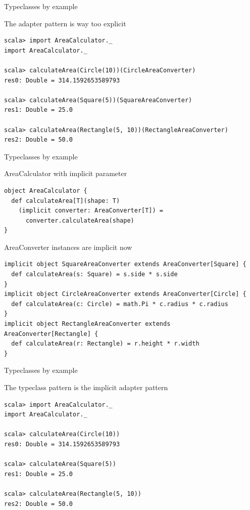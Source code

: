 \begin{frame}[fragile]{Typeclasses by example}
\begin{block}{The adapter pattern is way too explicit}
\begin{lstlisting}
scala> import AreaCalculator._
import AreaCalculator._

scala> calculateArea(Circle(10))(CircleAreaConverter)
res0: Double = 314.1592653589793

scala> calculateArea(Square(5))(SquareAreaConverter)
res1: Double = 25.0

scala> calculateArea(Rectangle(5, 10))(RectangleAreaConverter)
res2: Double = 50.0
\end{lstlisting}
\end{block}
\end{frame}

\begin{frame}[fragile]{Typeclasses by example}
\begin{exampleblock}{AreaCalculator with implicit parameter}
\begin{lstlisting}
object AreaCalculator {
  def calculateArea[T](shape: T)
    (implicit converter: AreaConverter[T]) =
      converter.calculateArea(shape)
}
\end{lstlisting}
\end{exampleblock}
\begin{exampleblock}{AreaConverter instances are implicit now}
\begin{lstlisting}
implicit object SquareAreaConverter extends AreaConverter[Square] {
  def calculateArea(s: Square) = s.side * s.side
}
implicit object CircleAreaConverter extends AreaConverter[Circle] {
  def calculateArea(c: Circle) = math.Pi * c.radius * c.radius
}
implicit object RectangleAreaConverter extends AreaConverter[Rectangle] {
  def calculateArea(r: Rectangle) = r.height * r.width
}
\end{lstlisting}
\end{exampleblock}
\end{frame}

\begin{frame}[fragile]{Typeclasses by example}
\begin{exampleblock}{The typeclass pattern is the implicit adapter pattern}
\begin{lstlisting}
scala> import AreaCalculator._
import AreaCalculator._

scala> calculateArea(Circle(10))
res0: Double = 314.1592653589793

scala> calculateArea(Square(5))
res1: Double = 25.0

scala> calculateArea(Rectangle(5, 10))
res2: Double = 50.0
\end{lstlisting}
\end{exampleblock}
\end{frame}

